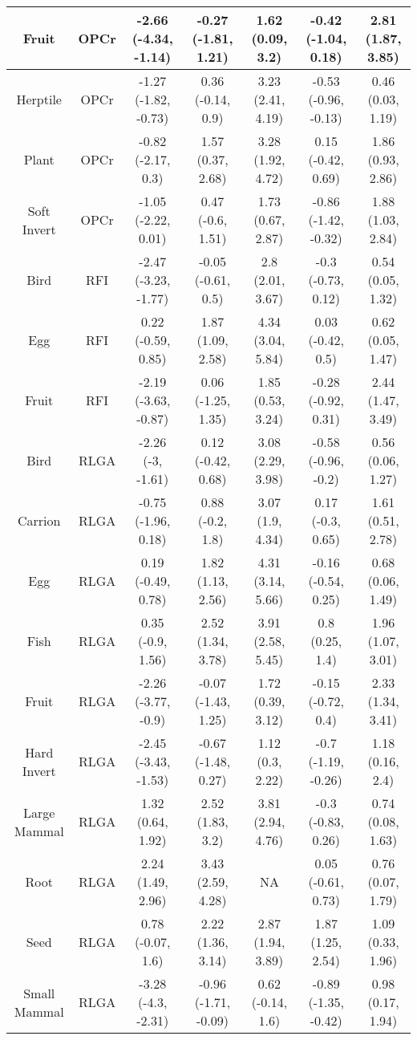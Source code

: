 \begin{table}
\begin{tabular}[t]{c|c|c|c|c|c|c}
\hline
Fruit & OPCr & -2.66 (-4.34, -1.14) & -0.27 (-1.81, 1.21) & 1.62 (0.09, 3.2) & -0.42 (-1.04, 0.18) & 2.81 (1.87, 3.85)\\
\hline
Herptile & OPCr & -1.27 (-1.82, -0.73) & 0.36 (-0.14, 0.9) & 3.23 (2.41, 4.19) & -0.53 (-0.96, -0.13) & 0.46 (0.03, 1.19)\\
\hline
Plant & OPCr & -0.82 (-2.17, 0.3) & 1.57 (0.37, 2.68) & 3.28 (1.92, 4.72) & 0.15 (-0.42, 0.69) & 1.86 (0.93, 2.86)\\
\hline
Soft Invert & OPCr & -1.05 (-2.22, 0.01) & 0.47 (-0.6, 1.51) & 1.73 (0.67, 2.87) & -0.86 (-1.42, -0.32) & 1.88 (1.03, 2.84)\\
\hline
Bird & RFI & -2.47 (-3.23, -1.77) & -0.05 (-0.61, 0.5) & 2.8 (2.01, 3.67) & -0.3 (-0.73, 0.12) & 0.54 (0.05, 1.32)\\
\hline
Egg & RFI & 0.22 (-0.59, 0.85) & 1.87 (1.09, 2.58) & 4.34 (3.04, 5.84) & 0.03 (-0.42, 0.5) & 0.62 (0.05, 1.47)\\
\hline
Fruit & RFI & -2.19 (-3.63, -0.87) & 0.06 (-1.25, 1.35) & 1.85 (0.53, 3.24) & -0.28 (-0.92, 0.31) & 2.44 (1.47, 3.49)\\
\hline
Bird & RLGA & -2.26 (-3, -1.61) & 0.12 (-0.42, 0.68) & 3.08 (2.29, 3.98) & -0.58 (-0.96, -0.2) & 0.56 (0.06, 1.27)\\
\hline
Carrion & RLGA & -0.75 (-1.96, 0.18) & 0.88 (-0.2, 1.8) & 3.07 (1.9, 4.34) & 0.17 (-0.3, 0.65) & 1.61 (0.51, 2.78)\\
\hline
Egg & RLGA & 0.19 (-0.49, 0.78) & 1.82 (1.13, 2.56) & 4.31 (3.14, 5.66) & -0.16 (-0.54, 0.25) & 0.68 (0.06, 1.49)\\
\hline
Fish & RLGA & 0.35 (-0.9, 1.56) & 2.52 (1.34, 3.78) & 3.91 (2.58, 5.45) & 0.8 (0.25, 1.4) & 1.96 (1.07, 3.01)\\
\hline
Fruit & RLGA & -2.26 (-3.77, -0.9) & -0.07 (-1.43, 1.25) & 1.72 (0.39, 3.12) & -0.15 (-0.72, 0.4) & 2.33 (1.34, 3.41)\\
\hline
Hard Invert & RLGA & -2.45 (-3.43, -1.53) & -0.67 (-1.48, 0.27) & 1.12 (0.3, 2.22) & -0.7 (-1.19, -0.26) & 1.18 (0.16, 2.4)\\
\hline
Large Mammal & RLGA & 1.32 (0.64, 1.92) & 2.52 (1.83, 3.2) & 3.81 (2.94, 4.76) & -0.3 (-0.83, 0.26) & 0.74 (0.08, 1.63)\\
\hline
Root & RLGA & 2.24 (1.49, 2.96) & 3.43 (2.59, 4.28) & NA & 0.05 (-0.61, 0.73) & 0.76 (0.07, 1.79)\\
\hline
Seed & RLGA & 0.78 (-0.07, 1.6) & 2.22 (1.36, 3.14) & 2.87 (1.94, 3.89) & 1.87 (1.25, 2.54) & 1.09 (0.33, 1.96)\\
\hline
Small Mammal & RLGA & -3.28 (-4.3, -2.31) & -0.96 (-1.71, -0.09) & 0.62 (-0.14, 1.6) & -0.89 (-1.35, -0.42) & 0.98 (0.17, 1.94)\\
\hline
\end{tabular}
\endgroup{}
\end{table}
